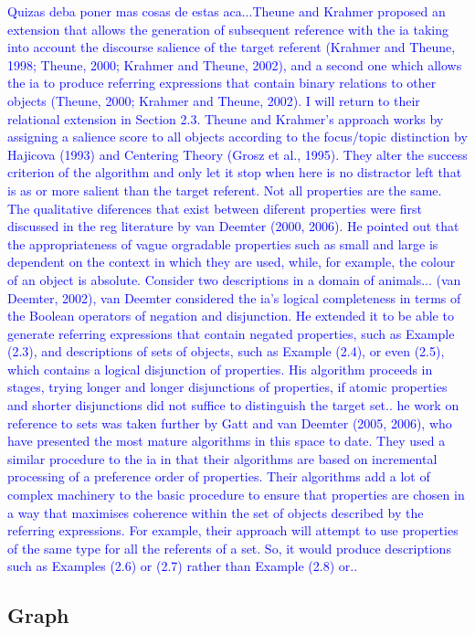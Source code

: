 \textcolor{blue}{Quizas deba poner mas cosas de estas aca...Theune and Krahmer proposed an extension that allows the generation of subsequent reference with the ia taking into account the discourse salience of the target referent (Krahmer and Theune, 1998; Theune, 2000; Krahmer and Theune, 2002), and a second one which allows the ia to produce referring expressions that
contain binary relations to other objects (Theune, 2000; Krahmer and Theune, 2002). I will return to their relational extension in Section 2.3. Theune and Krahmer's approach works by assigning a salience score to all objects according to the
focus/topic distinction by Hajicova (1993) and Centering Theory (Grosz et al., 1995). They alter the success criterion of the algorithm and only let it stop when here is no distractor left that is as or more salient than the target referent.
Not all properties are the same. The qualitative diferences that exist between diferent properties were first discussed in the
reg literature by van Deemter (2000, 2006). He pointed out that the appropriateness of
vague orgradable properties such as small and large is dependent on the context in which they are used, while,
for example, the colour of an object is absolute. Consider two descriptions in a domain of animals... (van Deemter, 2002), van Deemter considered the ia's logical completeness in terms of the Boolean operators of negation and disjunction. He extended it to
be able to generate referring expressions that contain negated properties, such as Example (2.3), and descriptions of sets of objects, such as Example (2.4), or even (2.5), which contains a logical disjunction of properties. His algorithm proceeds
in stages, trying longer and longer disjunctions of properties, if atomic properties
and shorter disjunctions did not suffice to distinguish the target set.. he work on reference to sets was taken further by Gatt and van Deemter (2005, 2006), who have presented the most mature algorithms in this space to
date. They used a similar procedure to the ia in that their algorithms are based
on incremental processing of a preference order of properties. Their algorithms
add a lot of complex machinery to the basic procedure to ensure that properties
are chosen in a way that maximises coherence within the set of objects described
by the referring expressions. For example, their approach will attempt to use
properties of the same type for all the referents of a set. So, it would produce
descriptions such as Examples (2.6) or (2.7) rather than Example (2.8) or.. }

\subsection{Graph}

